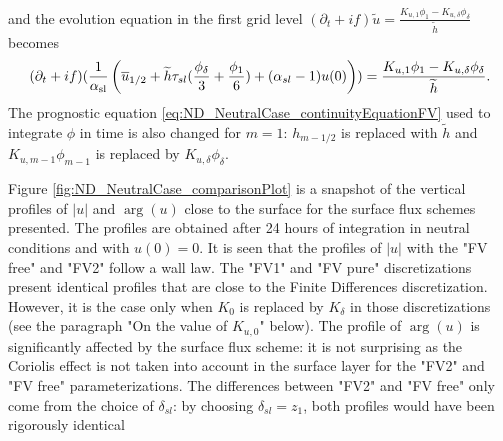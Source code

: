 and the evolution equation in the first grid level
$ (\partial_t+if) \widetilde{u}
= \frac{K_{u, 1}\phi_1 - K_{u,\delta} \phi_{\delta}}{\widetilde{h}}$
becomes
\begin{equation}
	\label{eq:ND_NeutralCase_semiDiscreteEkmanEqFVfree}
	(\partial_t+if) (\frac{1}{\alpha_{\rm sl}}
	\left(\overline{u}_{1/2} + \widetilde{h}\tau_{sl}
	(\frac{\phi_{\delta}}{3} + \frac{\phi_1}{6})
	+ (\alpha_{sl} - 1) u(0)
	\right))
	= \frac{K_{u, 1}\phi_1 - K_{u,\delta} \phi_{\delta}}{\widetilde{h}}.
\end{equation}
The prognostic equation \eqref{eq:ND_NeutralCase_continuityEquationFV}
used to integrate $\phi$ in time
is also changed for $m=1$: $h_{m-1/2}$ is replaced
with $\widetilde{h}$ and $K_{u, m-1}\phi_{m-1}$ is replaced by
$K_{u,\delta}\phi_{\delta}$.
%
\par
Figure \ref{fig:ND_NeutralCase_comparisonPlot} is a snapshot of
the vertical profiles of $|u|$ and $\arg(u)$ close to the surface
for the surface flux schemes presented.
The profiles are obtained after 24 hours of integration in neutral
conditions and with $u(0) = 0$.
It is seen that the profiles of $|u|$ with the "FV free" and "FV2"
follow a wall law. The "FV1" and "FV pure" discretizations
present identical profiles that are close to the Finite Differences
discretization. However, it is the case only when $K_0$ is
replaced by $K_{\delta}$ in those discretizations
(see the paragraph "On the value of $K_{u,0}$" below).
The profile of $\arg(u)$ is significantly affected by the surface
flux scheme: it is not surprising as the Coriolis effect is
not taken into account in the surface layer for the "FV2" and
"FV free" parameterizations.
The differences between "FV2" and "FV free" only come from the
choice of $\delta_{sl}$:
by choosing $\delta_{sl}=z_1$, both profiles would have been
rigorously identical
